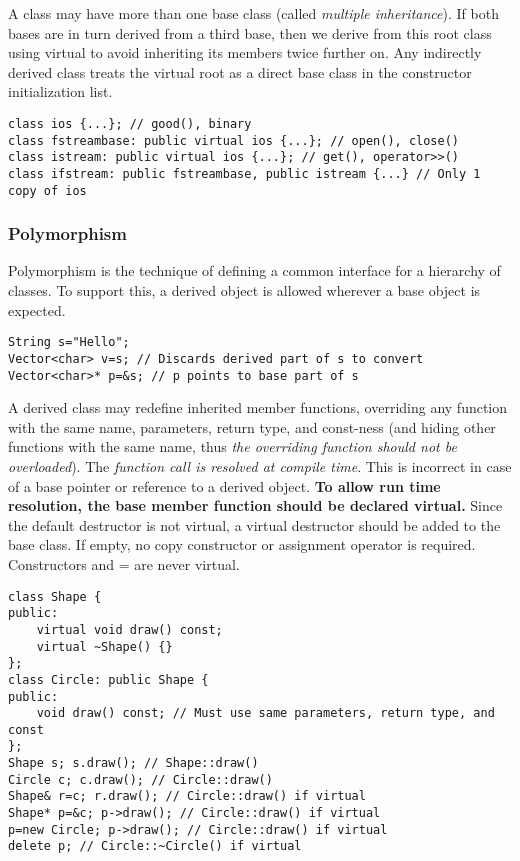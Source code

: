 			A class may have more than one base class (called \emph{multiple inheritance}). If both bases are in turn derived from a third base, then we derive from this root class using virtual to avoid inheriting its members twice further on. Any indirectly derived class treats the virtual root as a direct base class in the constructor initialization list.
			\begin{code}\begin{lstlisting}[style=list]
class ios {...}; // good(), binary
class fstreambase: public virtual ios {...}; // open(), close()
class istream: public virtual ios {...}; // get(), operator>>()
class ifstream: public fstreambase, public istream {...} // Only 1 copy of ios
			\end{lstlisting}\end{code}
			
		
		\subsubsection{Polymorphism} %
		
			Polymorphism is the technique of defining a common interface for a hierarchy of classes. To support this, a derived object is allowed wherever a base object is expected.
			\begin{code}\begin{lstlisting}[style=list]
String s="Hello";
Vector<char> v=s; // Discards derived part of s to convert
Vector<char>* p=&s; // p points to base part of s
			\end{lstlisting}\end{code}
			
			A derived class may redefine inherited member functions, overriding any function with the same name, parameters, return type, and const-ness (and hiding other functions with the same name, thus \emph{the overriding function should not be overloaded}). The \emph{function call is resolved at compile time}. This is incorrect in case of a base pointer or reference to a derived object. \textbf{To allow run time resolution, the base member function should be declared virtual.} Since the default destructor is not virtual, a virtual destructor should be added to the base class. If empty, no copy constructor or assignment operator is required. Constructors and = are never virtual.
			\begin{code}\begin{lstlisting}[style=list]
class Shape {
public:
	virtual void draw() const;
	virtual ~Shape() {}
};
class Circle: public Shape {
public:
	void draw() const; // Must use same parameters, return type, and const
};
Shape s; s.draw(); // Shape::draw()
Circle c; c.draw(); // Circle::draw()
Shape& r=c; r.draw(); // Circle::draw() if virtual
Shape* p=&c; p->draw(); // Circle::draw() if virtual
p=new Circle; p->draw(); // Circle::draw() if virtual
delete p; // Circle::~Circle() if virtual
			\end{lstlisting}\end{code}
			
